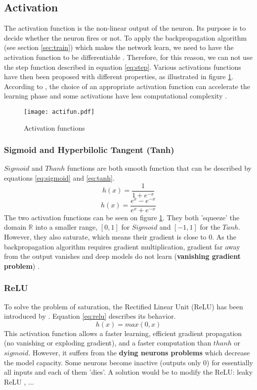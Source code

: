 \subsection{Activation} \label{subs:acti}
The activation function is the non-linear output of the neuron. Its purpose is to decide whether the neuron fires or not. To apply the backpropagation algorithm (see section \ref{sec:train}) which makes the network learn, we need to have the activation function to be differentiable \cite{lecun_backpropagation_1989}. Therefore, for this reason, we can not use the step function described in equation \eqref{eq:step}. Various activations functions have then been proposed with different properties, as illustrated in figure \ref{fig:acti}. According to \textcite{khan_survey_2020}, the choice of an appropriate activation function can accelerate the learning phase and some activations have less computational complexity \cite{krizhevsky_imagenet_2012}.
%
\begin{figure}
    \centering
    \texttt{[image: actifun.pdf]}
    \caption{Activation functions}
    \label{fig:acti}
\end{figure}
%
\subsubsection{Sigmoid and Hyperbilolic Tangent (Tanh)}
$Sigmoid$ and $Thanh$ functions are both smooth function that can be described by equations \eqref{eq:sigmoid} and \eqref{eq:tanh}.
%
\begin{equation}
    h(x) = \frac{1}{1 + e^{-x}}
    \label{eq:sigmoid}
\end{equation}
%
\begin{equation}
    h(x) = \frac{e^{x} - e^{-x}}{e^{x} + e^{-x}}
    \label{eq:tanh}
\end{equation}
%
The two activation functions can be seen on figure \ref{fig:acti}. They both 'squeeze' the domain $\mathbb{R}$ into a smaller range, $[0, 1]$ for $Sigmoid$ and $[-1, 1]$ for the $Tanh$. However, they also saturate, which means their gradient is close to 0. As the backpropagation algorithm requires gradient multiplication, gradient far away from the output vanishes and deep models do not learn (\textbf{vanishing gradient problem}) \cite{goodfellow_deep_2016}.
%
\subsubsection{ReLU}
To solve the problem of saturation, the Rectified Linear Unit (ReLU) has been introduced by \textcite{krizhevsky_imagenet_2012}. Equation \eqref{eq:relu} describes its behavior.
\begin{equation}
    h(x) = max(0, x)
    \label{eq:relu}
\end{equation}
%
This activation function allows a faster learning, efficient gradient propagation (no vanishing or exploding gradient), and a faster computation than $thanh$ or $sigmoid$. However, it suffers from the \textbf{dying neurons problems} which decrease the model capacity. Some neurons become inactive (outputs only 0) for essentially all inputs and each of them 'dies'. A solution would be to modify the ReLU: leaky ReLU \cite{maas_rectier_2014}, ...

